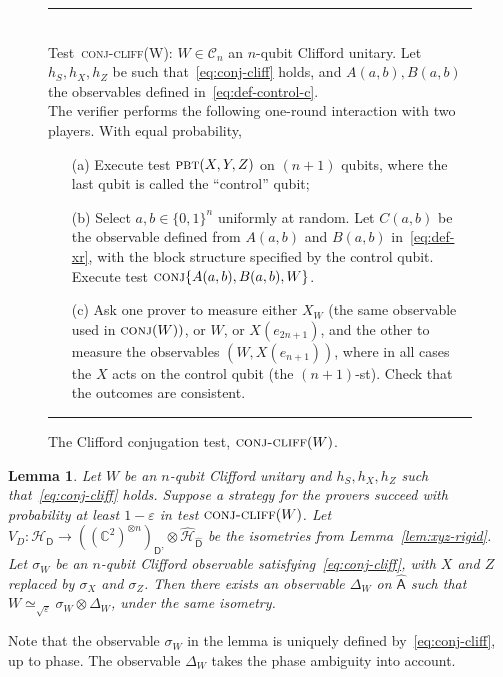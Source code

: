 \documentclass[11pt]{article}
\newtheorem{lemma}[theorem]{Lemma}
\theoremstyle{remark}
\theoremstyle{definition}
\newcommand{\reg}[1]{{\textsf{#1}}}
\newcommand{\C}{\ensuremath{\mathbb{C}}}
\newcommand{\mH}{\mathcal{H}}
\newcommand{\eps}{\varepsilon}
\newcommand{\pbt}{\textsc{pbt}}
\newcommand{\conj}{\textsc{conj}}
\newcommand{\perm}{\textsc{tens}}
\newcommand{\conjc}{\textsc{conj-cliff}}
\begin{document}
\begin{figure}[H]
\rule[1ex]{16.5cm}{0.5pt}\\
Test~\conjc(W): $W \in \mathcal{C}_n$ an $n$-qubit Clifford unitary. Let $h_S,h_X,h_Z$ be such that~\eqref{eq:conj-cliff} holds, and $A(a,b),B(a,b)$ the observables defined in~\eqref{eq:def-control-c}. \\
The verifier performs the following one-round interaction with two
players. With equal probability,
\begin{enumerate}
\item[(a)] Execute test $\pbt(X,Y,Z)$ on $(n+1)$ qubits, where the last qubit is called the ``control'' qubit;
\item[(b)] Select $a,b\in\{0,1\}^n$ uniformly at random. Let $C(a,b)$ be the observable defined from $A(a,b)$ and $B(a,b)$ in~\eqref{eq:def-xr}, with the block structure specified by the control qubit. Execute test $\conj\{A(a,b),B(a,b),W\}$.
\item[(c)] Ask one prover to measure either $X_W$ (the same observable used in $\conj(W))$, or $W$, or $X(e_{2n+1})$, and the other to measure the observables $(W, X(e_{n+1}))$, where in all cases the $X$ acts on the control qubit (the $(n+1)$-st). Check that the outcomes are consistent.
\end{enumerate}
\rule[2ex]{16.5cm}{0.5pt}\vspace{-1cm}
\caption{The Clifford conjugation test, $\conjc(W)$.}
\label{fig:conjugation-test-2}
\end{figure}


\begin{lemma}\label{lem:cliff-conj}
Let $W$ be an $n$-qubit Clifford unitary and $h_S,h_X,h_Z$ such that~\eqref{eq:conj-cliff} holds. Suppose a strategy for the provers succeed with probability at least $1-\eps$ in test $\conjc(W)$. Let $V_D:\mH_\reg{D} \to ((\C^2)^{\otimes n})_{\reg{D'}}  \otimes \hat{\mH}_{\hat{\reg{D}}}$ be the isometries from Lemma~\ref{lem:xyz-rigid}.  Let $\sigma_W$ be an $n$-qubit Clifford observable satisfying~\eqref{eq:conj-cliff}, with $X$ and $Z$ replaced by $\sigma_X$ and $\sigma_Z$. Then there exists an observable $\Delta_W$ on $\hat{\reg{A}}$ such that $W \simeq_{\sqrt{\eps}} \sigma_W\otimes \Delta_W$, under the same isometry.  
\end{lemma}

Note that the observable $\sigma_W$ in the lemma is uniquely defined by~\eqref{eq:conj-cliff}, up to phase. The observable $\Delta_W$ takes the phase ambiguity into account.
\end{document}
